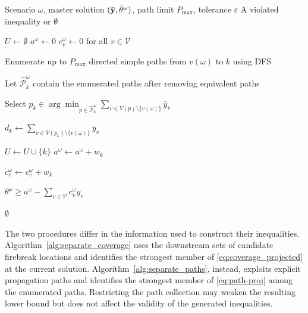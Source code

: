 \documentclass[a4paper,fleqn]{cas-sc}
\begin{document}
\begin{algorithm}[t]
\caption{Separation of \eqref{eq:path-proj}}
\label{alg:separate_paths}
\begin{algorithmic}[1]
\Require Scenario $\omega$, master solution
$(\bar{\vb{y}},\bar\theta^\omega)$,
path limit $P_{\max}$, tolerance $\varepsilon$
\Ensure A violated inequality or $\emptyset$

\State $U\gets\emptyset$
\State $a^\omega\gets0$
\State $c_v^\omega\gets0$ for all $v\in\mathcal V$


    \State Enumerate up to $P_{\max}$ directed simple paths
    from $v(\omega)$ to $k$ using DFS

    \State Let $\widehat{\mathcal P}_k^\omega$
    contain the enumerated paths after removing equivalent paths

    \State Select
    $p_k\in\displaystyle\arg\min_{p\in\widehat{\mathcal P}_k^\omega}
    \sum_{v\in V(p)\setminus\{v(\omega)\}}\bar y_v$

    \State $d_k\gets
    \displaystyle\sum_{v\in V(p_k)\setminus\{v(\omega)\}}\bar y_v$

        \State $U\gets U\cup\{k\}$
        \State $a^\omega\gets a^\omega+w_k$

            \State $c_v^\omega\gets c_v^\omega+w_k$
        \EndFor
    \EndIf

\EndFor

    \State \Return
    $\displaystyle\theta^\omega\geq
    a^\omega-\sum_{v\in\mathcal V}c_v^\omega y_v$
\EndIf

\State \Return $\emptyset$
\end{algorithmic}
\end{algorithm}

The two procedures differ in the information used to
construct their inequalities. Algorithm~\ref{alg:separate_coverage}
uses the downstream sets of candidate firebreak locations
and identifies the strongest member of
\eqref{eq:coverage_projected} at the current solution.
Algorithm~\ref{alg:separate_paths}, instead, exploits
explicit propagation paths and identifies the strongest
member of \eqref{eq:path-proj} among the enumerated paths.
Restricting the path collection may weaken the resulting
lower bound but does not affect the validity of the
generated inequalities.
\end{document}
